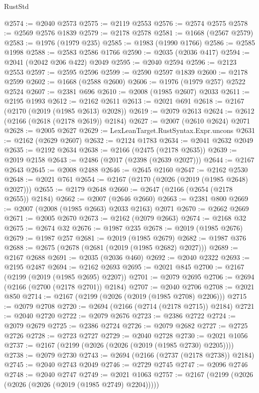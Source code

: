 \begin{lexlean}{RustStd}
\begin{coremodule}
@2574 := @2040 @2573
@2575 := @2119 @2553
@2576 := @2574 @2575
@2578 := @2569 @2576 @1839
@2579 := @2178 @2578
@2581 := @1668 (@2567 @2579)
@2583 := @1976 (@1979 @235)
@2585 := @1983 (@1990 @1766)
@2586 := @2585 @1998
@2588 := @2583 @2586 @1766
@2590 := @2035 (@2036 @417)
@2594 := @2041 (@2042 @206 @422) @2049
@2595 := @2040 @2594
@2596 := @2123 @2553
@2597 := @2595 @2596
@2599 := @2590 @2597 @1839
@2600 := @2178 @2599
@2602 := @1668 (@2588 @2600)
@2606 := @1976 (@1979 @257) @2522 @2524
@2607 := @2381 @696
@2610 := @2008 (@1985 @2607) @2033
@2611 := @2195 @1993
@2612 := @2162 @2611
@2613 := @2021 @691
@2618 := @2167 (@2170 (@2019 (@1985 @2613) @2028))
@2619 := @2079 @2613
@2624 := @2612 (@2166 (@2618 (@2178 @2619)) @2184)
@2627 := @2007 (@2610 @2624) @2071
@2628 := @2005 @2627
@2629 := LexLeanTarget.RustSyntax.Expr.uncons
@2631 := @2162 (@2629 @2607)
@2632 := @2124 @1783
@2634 := @2041 @2632 @2049
@2635 := @2192 @2634
@2638 := @2166 (@2475 (@2178 @2635))
@2639 := @2019 @2158
@2643 := @2486 (@2017 (@2398 (@2639 @2027)))
@2644 := @2167 @2643
@2645 := @2008 @2488
@2646 := @2645 @2160
@2647 := @2162 @2530
@2648 := @2021 @761
@2654 := @2167 (@2170 (@2026 (@2019 (@1985 @2648) @2027)))
@2655 := @2179 @2648
@2660 := @2647 (@2166 (@2654 (@2178 @2655)) @2184)
@2662 := @2007 (@2646 @2660)
@2663 := @2381 @800
@2669 := @2007 (@2008 (@1985 @2663) @2033 @2163) @2071
@2670 := @2662 @2669
@2671 := @2005 @2670
@2673 := @2162 (@2079 @2663)
@2674 := @2168 @32
@2675 := @2674 @32
@2676 := @1987 @235
@2678 := @2019 (@1985 @2676)
@2679 := @1987 @257
@2681 := @2019 (@1985 @2679)
@2682 := @1987 @376
@2688 := @2675 (@2678 (@2681 (@2019 (@1985 @2682) @2027)))
@2689 := @2167 @2688
@2691 := @2035 (@2036 @460)
@2692 := @2040 @2322
@2693 := @2195 @2487
@2694 := @2162 @2693
@2695 := @2021 @845
@2700 := @2167 (@2199 (@2019 (@1985 @2695) @2207))
@2701 := @2079 @2695
@2706 := @2694 (@2166 (@2700 (@2178 @2701)) @2184)
@2707 := @2040 @2706
@2708 := @2021 @850
@2714 := @2167 (@2199 (@2026 (@2019 (@1985 @2708) @2206)))
@2715 := @2079 @2708
@2720 := @2694 (@2166 (@2714 (@2178 @2715)) @2184)
@2721 := @2040 @2720
@2722 := @2079 @2676
@2723 := @2386 @2722
@2724 := @2079 @2679
@2725 := @2386 @2724
@2726 := @2079 @2682
@2727 := @2725 @2726
@2728 := @2723 @2727
@2729 := @2040 @2728
@2730 := @2021 @1056
@2737 := @2167 (@2199 (@2026 (@2026 (@2019 (@1985 @2730) @2205))))
@2738 := @2079 @2730
@2743 := @2694 (@2166 (@2737 (@2178 @2738)) @2184)
@2745 := @2040 @2743 @2049
@2746 := @2729 @2745
@2747 := @2096 @2746
@2748 := @2040 @2747
@2749 := @2021 @1063
@2757 := @2167 (@2199 (@2026 (@2026 (@2026 (@2019 (@1985 @2749) @2204)))))

\end{coremodule}
\end{lexlean}
